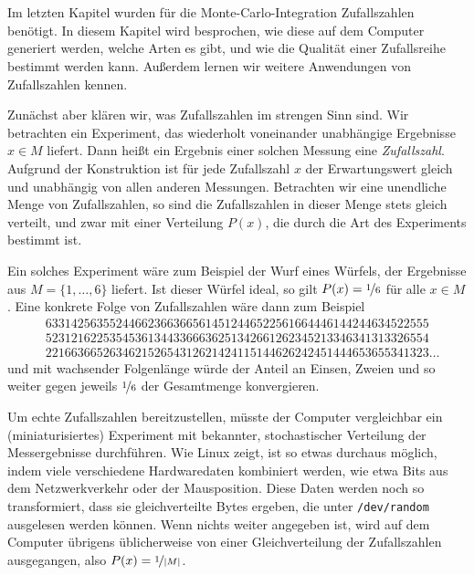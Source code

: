 % 

\chapter{}

Im letzten Kapitel wurden für die Monte-Carlo-Integration
Zufallszahlen benötigt. In diesem Kapitel wird besprochen, wie diese
auf dem Computer generiert werden, welche Arten es gibt, und wie die
Qualität einer Zufallsreihe bestimmt werden kann. Außerdem lernen wir
weitere Anwendungen von Zufallszahlen kennen.

Zunächst aber klären wir, was Zufallszahlen im strengen Sinn sind. Wir
betrachten ein Experiment, das wiederholt voneinander unabhängige
Ergebnisse $x \in M$ liefert.  Dann heißt ein Ergebnis einer solchen
Messung eine \emph{Zufallszahl}. Aufgrund der Konstruktion ist für
jede Zufallszahl $x$ der Erwartungswert gleich und unabhängig von
allen anderen Messungen. Betrachten wir eine unendliche
Menge von Zufallszahlen, so sind die Zufallszahlen in dieser Menge
stets gleich verteilt, und zwar mit einer Verteilung $P(x)$, die durch
die Art des Experiments bestimmt ist.

Ein solches Experiment wäre zum Beispiel der Wurf eines Würfels, der
Ergebnisse aus $M=\{1,\ldots,6\}$ liefert. Ist dieser Würfel ideal, so
gilt $P(x) =\nicefrac{1}{6}$ für alle $x\in M$. Eine konkrete
Folge von Zufallszahlen wäre dann zum Beispiel
\begin{align*}
&633142563552446623663665614512446522561664446144244634522555 \\
&523121622535453613443366636251342661262345213346341313326554 \\
&221663665263462152654312621424115144626242451444653655341323\ldots
\end{align*}
und mit wachsender Folgenlänge würde der Anteil an Einsen, Zweien und
so weiter gegen jeweils $\nicefrac{1}{6}$ der Gesamtmenge
konvergieren.

Um echte Zufallszahlen bereitzustellen, müsste der Computer
vergleichbar ein (miniaturisiertes) Experiment mit bekannter,
stochastischer Verteilung der Messergebnisse durchführen. Wie Linux
zeigt, ist so etwas durchaus möglich, indem viele verschiedene
Hardwaredaten kombiniert werden, wie etwa Bits aus dem Netzwerkverkehr
oder der Mausposition. Diese Daten werden noch so transformiert, dass
sie gleichverteilte Bytes ergeben, die unter \texttt{/dev/random}
ausgelesen werden können. Wenn nichts weiter angegeben ist, wird auf
dem Computer übrigens üblicherweise von einer Gleichverteilung der
Zufallszahlen ausgegangen, also $P(x) = \nicefrac{1}{\left\lvert{M}\right\rvert}$.

